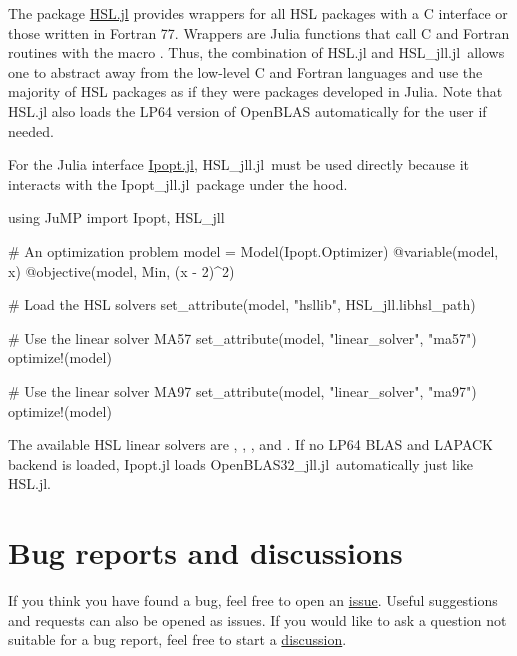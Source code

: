 \documentclass[gdweb]{geradwp}
\newcommand{\HSLjll}{HSL\_jll.jl}
\newcommand{\Ipoptjll}{Ipopt\_jll.jl}
\newcommand{\OpenBLASjll}{OpenBLAS32\_jll.jl}
\begin{document}
The package \href{https://github.com/JuliaSmoothOptimizers/HSL.jl}{HSL.jl} provides wrappers for all HSL packages with a C interface or those written in Fortran 77.
Wrappers are Julia functions that call C and Fortran routines with the macro .
Thus, the combination of HSL.jl and \HSLjll~allows one to abstract away from the low-level C and Fortran  languages and use the majority of HSL packages as if they were packages developed in Julia.
Note that HSL.jl also loads the LP64 version of OpenBLAS automatically for the user if needed.

For the Julia interface \href{https://github.com/jump-dev/Ipopt.jl}{Ipopt.jl}, \HSLjll~must be used directly because it interacts with the \Ipoptjll~package under the hood.

\begin{jllisting}
using JuMP
import Ipopt, HSL_jll

# An optimization problem
model = Model(Ipopt.Optimizer)
@variable(model, x)
@objective(model, Min, (x - 2)^2)

# Load the HSL solvers
set_attribute(model, "hsllib", HSL_jll.libhsl_path)

# Use the linear solver MA57
set_attribute(model, "linear_solver", "ma57")
optimize!(model)

# Use the linear solver MA97
set_attribute(model, "linear_solver", "ma97")
optimize!(model)
\end{jllisting}

The available HSL linear solvers are , , ,  and .
If no LP64 BLAS and LAPACK backend is loaded, Ipopt.jl loads \OpenBLASjll~automatically just like HSL.jl.

\section{Bug reports and discussions}

If you think you have found a bug, feel free to open an \href{https://github.com/ralna/JuliaHSL/issues}{issue}.
Useful suggestions and requests can also be opened as issues.
If you would like to ask a question not suitable for a bug report, feel free to start a \href{https://github.com/ralna/JuliaHSL/discussions}{discussion}.

% 
% 
\end{document}
